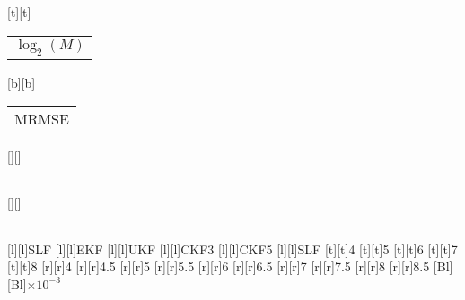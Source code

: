 %
%
[t][t]{\color[rgb]{0,0,0}\setlength{\tabcolsep}{0pt}\begin{tabular}{c}$\log_2 (M)$\end{tabular}}%
[b][b]{\color[rgb]{0,0,0}\setlength{\tabcolsep}{0pt}\begin{tabular}{c}MRMSE\end{tabular}}%
[][]{\color[rgb]{0,0,0}\setlength{\tabcolsep}{0pt}\begin{tabular}{c} \end{tabular}}%
[][]{\color[rgb]{0,0,0}\setlength{\tabcolsep}{0pt}\begin{tabular}{c} \end{tabular}}%
[l][l]{\color[rgb]{0,0,0}SLF}%
[l][l]{\color[rgb]{0,0,0}EKF}%
[l][l]{\color[rgb]{0,0,0}UKF}%
[l][l]{\color[rgb]{0,0,0}CKF3}%
[l][l]{\color[rgb]{0,0,0}CKF5}%
[l][l]{\color[rgb]{0,0,0}SLF}%
%
[t][t]{4}%
[t][t]{5}%
[t][t]{6}%
[t][t]{7}%
[t][t]{8}%
%
[r][r]{4}%
[r][r]{4.5}%
[r][r]{5}%
[r][r]{5.5}%
[r][r]{6}%
[r][r]{6.5}%
[r][r]{7}%
[r][r]{7.5}%
[r][r]{8}%
[r][r]{8.5}%
[Bl][Bl]{$\times 10^{-3}$}%
%
%
